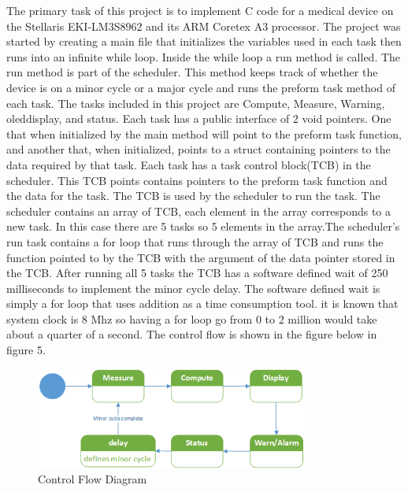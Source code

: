 \documentclass[12pt]{article} %
\begin{document}
The primary task of this project is to implement C code for a medical device on
the Stellaris EKI-LM3S8962 and its ARM Coretex A3 processor. The project was
started by creating a main file that initializes the variables used in each
task then runs into an infinite while loop. Inside the while loop a run method
is called. The run method is part of the scheduler. This method keeps track of
whether the device is on a minor cycle or a major cycle and runs the preform
task method of each task. The tasks included in this project are Compute,
Measure, Warning, oleddisplay, and status. Each task has a public interface of
2 void pointers. One that when initialized by the main method will point to the
preform task function, and another that, when initialized, points to a struct
containing pointers to the data required by that task. Each task has a task
control block(TCB) in the scheduler. This TCB points contains pointers to the
preform task function and the data for the task. The TCB is used by the
scheduler to run the task. The scheduler contains an array of TCB, each element
in the array corresponds to a new task. In this case there are 5 tasks so 5
elements in the array.The scheduler's run task contains a for loop that runs
through the array of TCB and runs the function pointed to by the TCB with the
argument of the data pointer stored in the TCB. After running all 5 tasks the
TCB has a software defined wait of 250 milliseconds to implement the minor
cycle delay. The software defined wait is simply a for loop that uses addition
as a time consumption tool. it is known that system clock is 8 Mhz so having a
for loop go from 0 to 2 million would take about a quarter of a second. The
control flow is shown in the figure below in figure 5. 

\begin{figure}[h]
    \centering
    \includegraphics[width=0.8\textwidth]{../design/Control_state_diagram.png}
    \caption{Control Flow Diagram}
    \label{fig:Control}
\end{figure}
\end{document}
